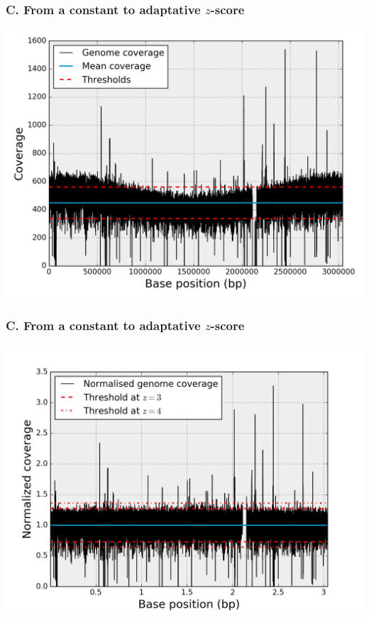 \documentclass{beamer}
\begin{document}
\begin{frame}
\frametitle{C. From a constant to adaptative $z$-score}
\includegraphics[height=0.9\textheight, width=1\textwidth]{images/fig1.png}
 \end{frame}
\begin{frame}
\frametitle{C. From a constant to adaptative $z$-score}
\includegraphics[height=0.9\textheight, width=1\textwidth]{images/fig2.png}
 \end{frame}
\end{document}
